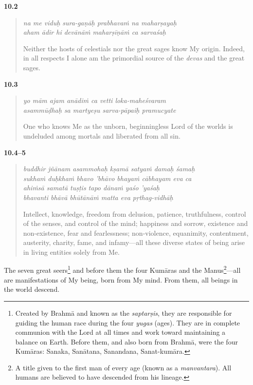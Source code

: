 \par\noindent\textbf{10.2}\par
\begin{verse}
\textit{na me viduḥ sura-gaṇāḥ prabhavaṁ na maharṣayaḥ} \\
\textit{aham ādir hi devānāṁ maharṣīṇāṁ ca sarvaśaḥ}

\noindent Neither the hosts of celestials nor the great sages know My origin. Indeed, in all respects I alone am the primordial source of the \textit{devas} and the great sages.
\end{verse}
\par



\par\noindent\textbf{10.3}\par
\begin{verse}
\textit{yo mām ajam anādiṁ ca vetti loka-maheśvaram} \\
\textit{asammūḍhaḥ sa martyeṣu sarva-pāpaiḥ pramucyate}

\noindent One who knows Me as the unborn, beginningless Lord of the worlds is undeluded among mortals and liberated from all sin.
\end{verse}
\par



\par\noindent\textbf{10.4–5}\par
\begin{verse}
\textit{buddhir jñānam asammohaḥ kṣamā satyaṁ damaḥ śamaḥ} \\
\textit{sukhaṁ duḥkhaṁ bhavo ’bhāvo bhayaṁ cābhayam eva ca} \\
\textit{ahiṁsā samatā tuṣṭis tapo dānaṁ yaśo ’yaśaḥ} \\
\textit{bhavanti bhāvā bhūtānāṁ matta eva pṛthag-vidhāḥ}

\noindent Intellect, knowledge, freedom from delusion, patience, truthfulness, control of the senses, and control of the mind; happiness and sorrow, existence and non-existence, fear and fearlessness; non-violence, equanimity, contentment, austerity, charity, fame, and infamy---all these diverse states of being arise in living entities solely from Me.
\end{verse}
\par


{The seven great seers\footnote{Created by Brahmā and known as the \textit{saptarṣis}, they are responsible for guiding the human race during the four \textit{yugas} (ages). They are in complete communion with the Lord at all times and work toward maintaining a balance on Earth. Before them, and also born from Brahmā, were the four Kumāras: Sanaka, Sanātana, Sanandana, Sanat-kumāra.} and before them the four Kumāras and the Manus\footnote{A title given to the first man of every age (known as a \textit{manvantara}). All humans are believed to have descended from his lineage.
}---all are manifestations of My being, born from My mind. From them, all beings in the world descend.}


